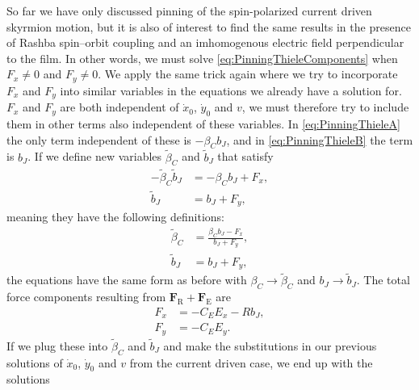 So far we have only discussed pinning of the spin-polarized current driven skyrmion motion, but it is also of interest to find the same results in the presence of Rashba spin--orbit coupling and an imhomogenous electric field perpendicular to the film. In other words, we must solve \eqref{eq:PinningThieleComponents} when $F_x \neq 0$ and $F_y \neq 0$. We apply the same trick again where we try to incorporate $F_x$ and $F_y$ into similar variables in the equations we already have a solution for. $F_x$ and $F_y$ are both independent of $\dot{x}_0$, $\dot{y}_0$ and $v$, we must therefore try to include them in other terms also independent of these variables. In \eqref{eq:PinningThieleA} the only term independent of these is $-\beta_Cb_J$, and in \eqref{eq:PinningThieleB} the term is $b_J$. If we define new variables $\tilde{\beta}_C$ and $\tilde{b}_J$ that satisfy
\begin{subequations}
\begin{align}
-\tilde{\beta}_C\tilde{b}_J &= -\beta_Cb_J + F_x, \\
\tilde{b}_J &= b_J + F_y,
\end{align}
\end{subequations}
meaning they have the following definitions:
\begin{subequations}
\begin{align}
\tilde{\beta}_C &= \frac{\beta_Cb_J-F_x}{b_J+F_y}, \\
\tilde{b}_J &= b_J + F_y,
\end{align}
\end{subequations}
the equations have the same form as before with $\beta_C \rightarrow \tilde{\beta}_C$ and $b_J \rightarrow \tilde{b}_J$. The total force components resulting from $\mathbold{F}_{\text{R}}+\mathbold{F}_{\text{E}}$ are
\begin{subequations}
\begin{align}
F_x &= -C_E E_x - Rb_J, \\
F_y &= -C_E E_y.
\end{align}
\end{subequations}
If we plug these into $\tilde{\beta}_C$ and $\tilde{b}_J$ and make the substitutions in our previous solutions of $\dot{x}_0$, $\dot{y}_0$ and $v$ from the current driven case, we end up with the solutions
